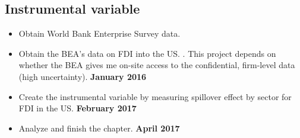 \subsection{Instrumental variable}
\begin{itemize}
\item Obtain World Bank Enterprise Survey data. 
\item Obtain the BEA's data on FDI into the US. . This project depends on whether the BEA gives me on-site access to the confidential, firm-level data (high uncertainty). \textbf{January 2016}
\item Create the instrumental variable by measuring spillover effect by sector for FDI in the US. \textbf{February 2017}
\item Analyze and finish the chapter. \textbf{April 2017}
\end{itemize}